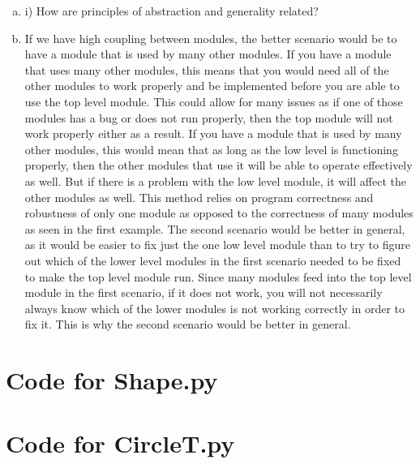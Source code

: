 \documentclass[12pt]{article}
\begin{document}
\begin{enumerate}[a)]
\item i) How are principles of abstraction and generality related?




\item If we have high coupling between modules, the better scenario would be to have a module that is used by many other modules. If you have a module that uses many other modules, this means that you would need all of the other modules to work properly and be implemented before you are able to use the top level module. This could allow for many issues as if one of those modules has a bug or does not run properly, then the top module will not work properly either as a result. If you have a module that is used by many other modules, this would mean that as long as the low level is functioning properly, then the other modules that use it will be able to operate effectively as well. But if there is a problem with the low level module, it will affect the other modules as well. This method relies on program correctness and robustness of only one module as opposed to the correctness of many modules as seen in the first example. 
The second scenario would be better in general, as it would be easier to fix just the one low level module than to try to figure out which of the lower level modules in the first scenario needed to be fixed to make the top level module run. Since many modules feed into the top level module in the first scenario, if it does not work, you will not necessarily always know which of the lower modules is not working correctly in order to fix it. This is why the second scenario would be better in general. 

\end{enumerate}

\newpage

\lstset{language=Python, basicstyle=\tiny, breaklines=true, showspaces=false,
  showstringspaces=false, breakatwhitespace=true}

\def\thesection{\Alph{section}}

\section{Code for Shape.py}

\noindent 

\newpage

\section{Code for CircleT.py}
\end{document}
